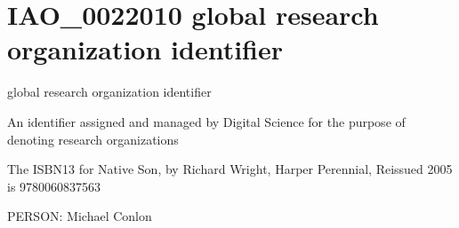 \documentclass[letterpaper,10pt,english]{sphinxmanual}
\begin{document}
\section{IAO\_0022010 \sphinxhyphen{} global research organization identifier}
\label{\detokenize{doc-IAO_0022010:iao-0022010-global-research-organization-identifier}}\label{\detokenize{doc-IAO_0022010:index-0}}\label{\detokenize{doc-IAO_0022010::doc}}
\begin{sphinxShadowBox}

\sphinxAtStartPar
global research organization identifier
\end{sphinxShadowBox}

\begin{sphinxShadowBox}

\sphinxAtStartPar
An identifier assigned and managed by Digital Science for the purpose of denoting research organizations
\end{sphinxShadowBox}

\begin{sphinxShadowBox}

\sphinxAtStartPar
{}
\end{sphinxShadowBox}

\begin{sphinxShadowBox}

\sphinxAtStartPar
The ISBN\sphinxhyphen{}13 for Native Son, by Richard Wright, Harper Perennial, Reissued 2005 is 978\sphinxhyphen{}0\sphinxhyphen{}06\sphinxhyphen{}083756\sphinxhyphen{}3
\end{sphinxShadowBox}

\begin{sphinxShadowBox}

\sphinxAtStartPar
{}
\end{sphinxShadowBox}

\begin{sphinxShadowBox}

\sphinxAtStartPar
PERSON: Michael Conlon
\end{sphinxShadowBox}
\begin{quote}
\label{\detokenize{doc-IAO_0022014:iao-0022014}}\label{\detokenize{doc-IAO_0022014:international-standard-name-identifier}}\label{\detokenize{doc-IAO_0022014:iao-0022014}}
\ignorespaces \end{quote}
\end{document}
